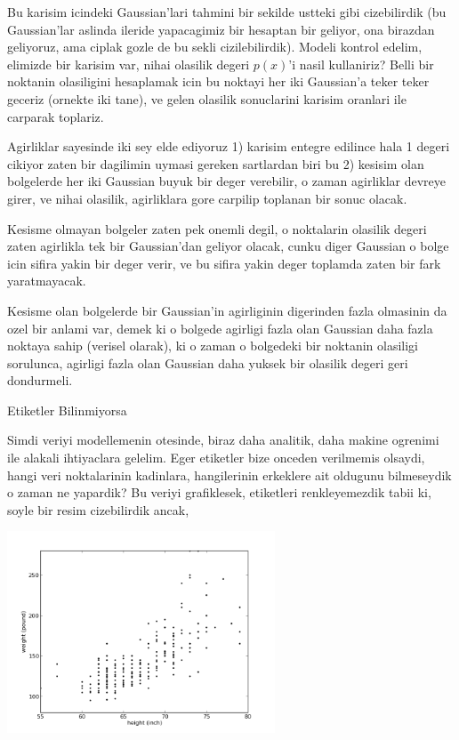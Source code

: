 \documentclass[12pt,fleqn]{article}\usepackage{../common}
\begin{document}
Bu karisim icindeki Gaussian'lari tahmini bir sekilde ustteki gibi
cizebilirdik (bu Gaussian'lar aslinda ileride yapacagimiz bir hesaptan bir
geliyor, ona birazdan geliyoruz, ama ciplak gozle de bu sekli
cizilebilirdik). Modeli kontrol edelim, elimizde bir karisim var, nihai
olasilik degeri $p(x)$'i nasil kullaniriz? Belli bir noktanin olasiligini
hesaplamak icin bu noktayi her iki Gaussian'a teker teker geceriz (ornekte
iki tane), ve gelen olasilik sonuclarini karisim oranlari ile carparak
toplariz.

Agirliklar sayesinde iki sey elde ediyoruz 1) karisim entegre edilince hala
1 degeri cikiyor zaten bir dagilimin uymasi gereken sartlardan biri bu 2)
kesisim olan bolgelerde her iki Gaussian buyuk bir deger verebilir, o zaman
agirliklar devreye girer, ve nihai olasilik, agirliklara gore carpilip
toplanan bir sonuc olacak. 

Kesisme olmayan bolgeler zaten pek onemli degil, o noktalarin olasilik
degeri zaten agirlikla tek bir Gaussian'dan geliyor olacak, cunku diger
Gaussian o bolge icin sifira yakin bir deger verir, ve bu sifira yakin
deger toplamda zaten bir fark yaratmayacak.

Kesisme olan bolgelerde bir Gaussian'in agirliginin digerinden fazla
olmasinin da ozel bir anlami var, demek ki o bolgede agirligi fazla olan
Gaussian daha fazla noktaya sahip (verisel olarak), ki o zaman o bolgedeki
bir noktanin olasiligi sorulunca, agirligi fazla olan Gaussian daha yuksek
bir olasilik degeri geri dondurmeli.

Etiketler Bilinmiyorsa

Simdi veriyi modellemenin otesinde, biraz daha analitik, daha makine
ogrenimi ile alakali ihtiyaclara gelelim. Eger etiketler bize onceden
verilmemis olsaydi, hangi veri noktalarinin kadinlara, hangilerinin
erkeklere ait oldugunu bilmeseydik o zaman ne yapardik? Bu veriyi
grafiklesek, etiketleri renkleyemezdik tabii ki, soyle bir resim
cizebilirdik ancak,

\includegraphics[height=6cm]{plotbio2.png}
\end{document}
